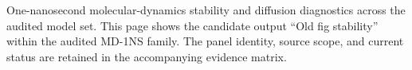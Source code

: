 One-nanosecond molecular-dynamics stability and diffusion diagnostics across the audited model set. This page shows the candidate output ``Old fig stability'' within the audited MD-1NS family. The panel identity, source scope, and current status are retained in the accompanying evidence matrix.
